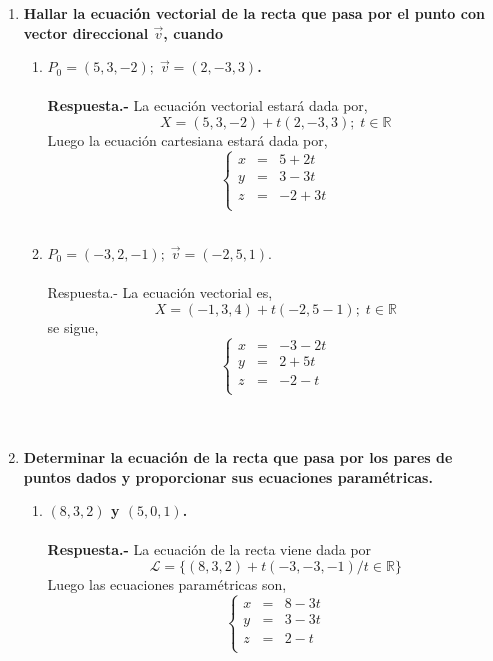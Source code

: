 \begin{enumerate}

    \item \textbf{\boldmath Hallar la ecuación vectorial de la recta que pasa por el punto con vector direccional $\vec{v}$, cuando}
	\begin{enumerate}[\bfseries a)]
	    
	    \item \textbf{\boldmath $P_0=(5,3,-2); \; \vec{v}=(2,-3,3)$.\\\\
		Respuesta.-}\; La ecuación vectorial estará dada por, $$ X = (5,3,-2) + t(2,-3,3) ;\;  t \in \mathbb{R}$$ 
		Luego la ecuación cartesiana estará dada por, 
		$$\left\{\begin{array}{rcr}
		    x&=&5+2t\\
		    y&=&3-3t\\
		    z&=&-2+3t\\
		\end{array}\right.$$\\

	    \item $P_0=(-3,2,-1); \; \vec{v}=(-2,5,1)$.\\\\
		Respuesta.-\; La ecuación vectorial es, $$X= (-1,3,4) + t(-2,5-1) ;\;  t\in \mathbb{R} $$
		se sigue,
		$$\left\{\begin{array}{rcr}
		    x&=&-3-2t\\
		    y&=&2+5t\\
		    z&=&-2-t\\
		\end{array}\right.$$\\\\

	\end{enumerate}

    \item \textbf{Determinar la ecuación de la recta que pasa por los pares de puntos dados y proporcionar sus ecuaciones paramétricas.}

	\begin{enumerate}[\bfseries a)]
	    
	    \item \textbf{\boldmath $(8,3,2)$ y $(5,0,1)$.\\\\
		Respuesta.-}\; La ecuación de la recta viene dada por 
		$$\mathcal{L} = \lbrace (8,3,2) + t(-3,-3,-1) / t\in \mathbb{R} \rbrace$$
		Luego las ecuaciones paramétricas son, 
		$$\left\{\begin{array}{rcr}
		    x&=&8-3t\\
		    y&=&3-3t\\
		    z&=&2-t\\
		\end{array}\right.$$\\


\end{enumerate}
\end{enumerate}
